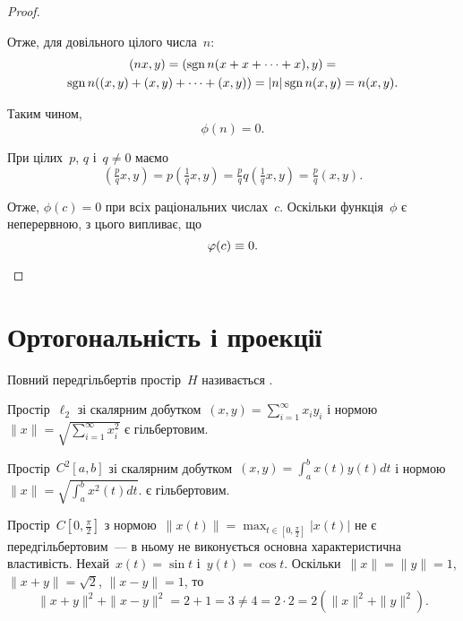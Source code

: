 \begin{proof}
\begin{enumerate}
        Отже, для довільного цілого числа~$n$:
        \begin{multline*}
            (n x, y) = (\sign n (x + x + \dots + x), y) = \\
            \sign n ((x, y) + (x, y) + \dots + (x, y)) =
            |n| \sign n (x, y) = n (x, y).
        \end{multline*}
        
        Таким чином,
        \begin{equation*}
            \phi(n) = 0.
        \end{equation*}
        
        При цілих~$p$, $q$ і~$q \ne 0$ маємо
        \begin{equation*}
            \left( \tfrac{p}{q} x, y \right) =
            p \left( \tfrac{1}{q} x, y \right) =
            \tfrac{p}{q} q \left( \tfrac{1}{q} x, y \right) =
            \tfrac{p}{q} (x, y).
        \end{equation*}
        
        Отже, $\phi(c) = 0$ при всіх раціональних числах~$c$. Оскільки функція~$\phi$ є неперервною, з цього випливає, що
        \begin{equation*}
            \phi(c) \equiv 0. \qedhere
        \end{equation*}
    \end{enumerate}
\end{proof}

\section{Ортогональність і проекції}

\begin{definition}
    Повний передгільбертів простір~$H$ називається .
\end{definition}

\begin{example}
    Простір~$\ell_2$ зі скалярним добутком~$(x, y) = \sum_{i = 1}^\infty x_i y_i$ і нормою~$\|x\| = \sqrt{\sum_{i = 1}^\infty x_i^2}$ є гільбертовим.
\end{example}

\begin{example}
    Простір~$C^2[a, b]$ зі скалярним добутком~$(x, y) = \int_a^b x(t) y(t) dt$ і нормою~$\|x\| = \sqrt{\int_a^b x^2(t) dt}$. є гільбертовим.
\end{example}

\begin{example}
    Простір~$C[0, \frac{\pi}{2}]$ з нормою~$\|x(t)\| = \max_{t \in [0, \frac{\pi}{2}]} |x(t)|$ не є передгільбертовим~--- в ньому не виконується основна характеристична властивість. Нехай~$x(t) = \sin t$ і~$y(t) = \cos t$. Оскільки~$\|x\| = \|y\| = 1$, $\|x + y\| = \sqrt{2}$, $\|x - y\| = 1$, то
    \begin{equation*}
        \|x + y\|^2 + \|x - y\|^2 = 2 + 1 = 3 \ne
        4 = 2 \cdot 2 = 2 (\|x\|^2 + \|y\|^2).
    \end{equation*}
\end{example}

